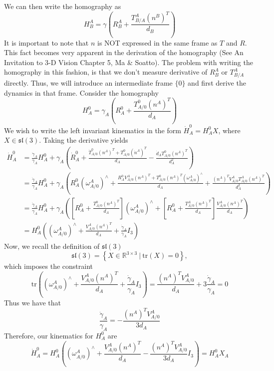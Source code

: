 \documentclass[a4paper]{article}
\begin{document}
We can then write the homography as 
\[
    H_{B}^{A} = \gamma \left( R_{B}^{A} + \frac{T_{B/A}^A (n^B)^T}{d_{B}} \right)
\]
It is important to note that $n$ is NOT expressed in the same frame as $T$ and $R$. This fact becomes very apparent in the derivation of the homography (See An Invitation to 3-D Vision Chapter 5, Ma \& Soatto). The problem with writing the homography in this fashion, is that we don't measure derivative of $R_{B}^A$ or $T_{B/A}^A$ directly. Thus, we will introduce an intermediate frame $\{0\}$ and first derive the dynamics in that frame. Consider the homography 
\[
    H_A^0 = \gamma_A \left( R_A^0 + \frac{T_{A/0}^0(n^A)^T}{d_A} \right)
\]
We wish to write the left invariant kinematics in the form $\dot{H}_A^0 = H_A^0X$, where $X \in \mathfrak{sl}(3)$. Taking the derivative yields
\[
    \begin{aligned}
        \dot{H}_{A}^0 &= \frac{\dot{\gamma}_A}{\gamma_A}H_{A}^0 + \gamma_A \left( \dot{R}_A^0 + \frac{\dot{T}_{A/0}^0 (n^A)^T + T_{A/0}^0(\dot{n}^A)^T}{d_A} - \frac{\dot{d}_AT_{A/0}^0(n^A)^T}{d_A^2}\right) \\
                      &= \frac{\dot{\gamma}_A}{\gamma_A}H_{A}^0 + \gamma_A \left( R_A^0 \left( \omega_{A/0}^A \right)^{\wedge} + \frac{R_{A}^0V_{A/0}^A(n^A)^T + T_{A/0}^0(n^A)^T \left( \omega_{A/0}^A \right)^{\wedge}}{d_A} + \frac{(n^A)^TV_{A/0}^AT_{A/0}^A(n^A)^T}{d_A^2} \right) \\
                      &= \frac{\dot{\gamma}_A}{\gamma_A}H_{A}^0 + \gamma_A \left( \left[ R_{A}^0 + \frac{T_{A/0}^0(n^A)^T}{d_A} \right]\left(\omega_{A/0}^A\right)^{\wedge} + \left[ R_A^0 + \frac{T_{A/0}^A(n^A)^T}{d_A}\right]\frac{V_{A/0}^A(n^A)^T}{d_A} \right) \\
                      &= H_A^0 \left( \left( \omega_{A/0}^A \right)^{\wedge}  +  \frac{V_{A/0}^A(n^A)^T}{d_A} + \frac{\dot{\gamma}_A}{\gamma_A}I_3 \right)
    \end{aligned}
\]
Now, we recall the definition of $\mathfrak{sl}(3)$
\[
    \mathfrak{sl}(3) = \left\{ X \in \mathds{R}^{3 \times 3}\ |\ \text{tr}(X) = 0 \right\},
\]
which imposes the constraint
\[
    \text{tr} \left( \left( \omega_{A/0}^A \right)^{\wedge}  +  \frac{V_{A/0}^A(n^A)^T}{d_A} + \frac{\dot{\gamma}_A}{\gamma_A}I_3 \right) = \frac{(n^A)^TV_{A/0}^A}{d_A} + 3\frac{\dot{\gamma}_A}{\gamma_{A}} = 0
\]
Thus we have that
\[
    \frac{\dot{\gamma}_A}{\gamma_A} = -\frac{(n^A)^TV_{A/0}^A}{3d_A}
\]
Therefore, our kinematics for $H_A^0$ are
\[
    \dot{H}_A^0 = H_A^0 \left( \left( \omega_{A/0}^A \right)^{\wedge} +  \frac{V_{A/0}^A(n^A)^T}{d_A}-\frac{(n^A)^TV_{A/0}^A}{3d_A}I_3 \right) = H_A^0X_A
\]
\end{document}
